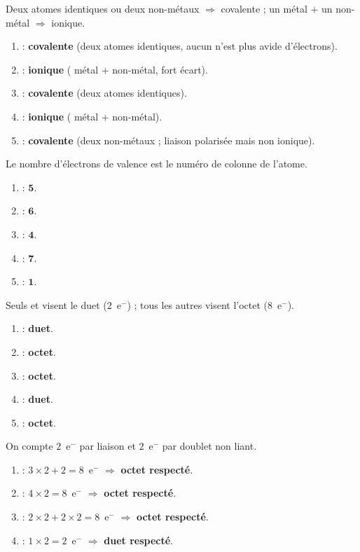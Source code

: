 \documentclass[11pt,a4paper]{article}
\begin{document}
\begin{corrige}
Deux atomes identiques ou deux non-métaux $\Rightarrow$ covalente ; un métal $+$ un non-métal
$\Rightarrow$ ionique.
\begin{enumerate}[label=\alph*)]
  \item {} : \textbf{covalente} (deux atomes identiques, aucun n'est plus avide d'électrons).
  \item {} : \textbf{ionique} ( métal $+$  non-métal, fort écart).
  \item {} : \textbf{covalente} (deux atomes identiques).
  \item {} : \textbf{ionique} ( métal $+$  non-métal).
  \item {} : \textbf{covalente} (deux non-métaux ; liaison polarisée mais non ionique).
\end{enumerate}
\end{corrige}

\begin{corrige}
Le nombre d'électrons de valence est le numéro de colonne de l'atome.
\begin{enumerate}[label=\alph*)]
  \item {} : $\mathbf{5}$.
  \item {} : $\mathbf{6}$.
  \item {} : $\mathbf{4}$.
  \item {} : $\mathbf{7}$.
  \item {} : $\mathbf{1}$.
\end{enumerate}
\end{corrige}

\begin{corrige}
Seuls  et  visent le duet ($2$~e$^-$) ; tous les autres visent l'octet ($8$~e$^-$).
\begin{enumerate}[label=\alph*)]
  \item {} : \textbf{duet}.
  \item {} : \textbf{octet}.
  \item {} : \textbf{octet}.
  \item {} : \textbf{duet}.
  \item {} : \textbf{octet}.
\end{enumerate}
\end{corrige}

\begin{corrige}
On compte $2$~e$^-$ par liaison et $2$~e$^-$ par doublet non liant.
\begin{enumerate}[label=\alph*)]
  \item {} : $3\times 2 + 2 = 8$~e$^-$ $\Rightarrow$ \textbf{octet respecté}.
  \item {} : $4\times 2 = 8$~e$^-$ $\Rightarrow$ \textbf{octet respecté}.
  \item {} : $2\times 2 + 2\times 2 = 8$~e$^-$ $\Rightarrow$ \textbf{octet respecté}.
  \item {} : $1\times 2 = 2$~e$^-$ $\Rightarrow$ \textbf{duet respecté}.
\end{enumerate}
\end{corrige}
\end{document}
